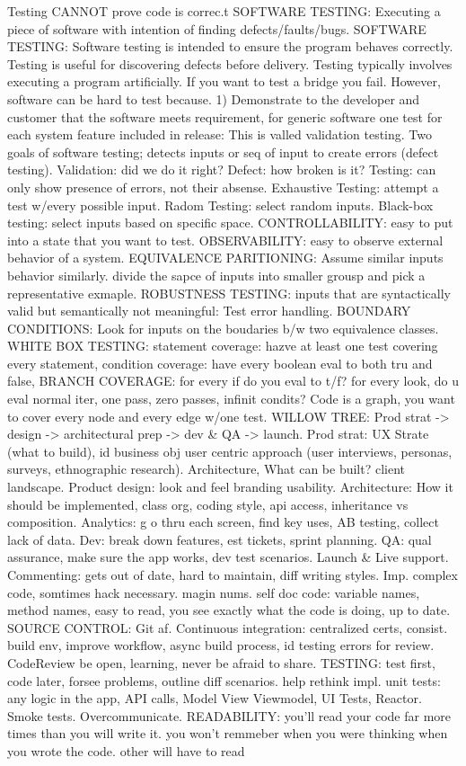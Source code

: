 \documentclass[10pt]{article}
\begin{document}
\begin{landscape}
\begin{multicols*}{6}
Testing CANNOT prove code is correc.t SOFTWARE TESTING: Executing a piece of software with intention of finding defects/faults/bugs. SOFTWARE TESTING: Software testing is intended to ensure the program behaves correctly. Testing is useful for discovering defects before delivery. Testing typically involves executing a program artificially. If you want to test a bridge you fail. However, software can be hard to test because. 1) Demonstrate to the developer and customer that the software meets requirement, for generic software one test for each system feature included in release: This is valled validation testing. Two goals of software testing; detects inputs or seq of input to create errors (defect testing). Validation: did we do it right? Defect: how broken is it? Testing: can only show presence of errors, not their absense. Exhaustive Testing: attempt a test w/every possible input. Radom Testing: select random inputs. Black-box testing: select inputs based on specific space. CONTROLLABILITY: easy to put into a state that you want to test. OBSERVABILITY: easy to observe external behavior of a system. EQUIVALENCE PARITIONING: Assume similar inputs behavior similarly. divide the sapce of inputs into smaller grousp and pick a representative exmaple. ROBUSTNESS TESTING: inputs that are syntactically valid but semantically not meaningful: Test error handling. BOUNDARY CONDITIONS: Look for inputs on the boudaries b/w two equivalence classes. WHITE BOX TESTING: statement coverage: hazve at least one test covering every statement, condition coverage: have every boolean eval to both tru and false, BRANCH COVERAGE: for every if do you eval to t/f? for every look, do u eval normal iter, one pass, zero passes, infinit condits? Code is a graph, you want to cover every node and every edge w/one test. WILLOW TREE: Prod strat -> design -> architectural prep -> dev & QA -> launch. Prod strat: UX Strate (what to build), id business obj user centric approach (user interviews, personas, surveys, ethnographic research). Architecture, What can be built? client landscape. Product design: look and feel branding usability. Architecture: How it should be implemented, class org, coding style, api access, inheritance vs composition. Analytics: g o thru each screen, find key uses, AB testing, collect lack of data. Dev: break down features, est tickets, sprint planning. QA: qual assurance, make sure the app works, dev test scenarios. Launch & Live support. Commenting: gets out of date, hard to maintain, diff writing styles. Imp. complex code, somtimes hack necessary. magin nums. self doc code: variable names, method names, easy to read, you see exactly what the code is doing, up to date. SOURCE CONTROL: Git af. Continuous integration: centralized certs, consist. build env, improve workflow, async build process, id testing errors for review. CodeReview be open, learning, never be afraid to share. TESTING: test first, code later, forsee problems, outline diff scenarios. help rethink impl. unit tests: any logic in the app, API calls, Model View Viewmodel, UI Tests, Reactor. Smoke tests. Overcommunicate. READABILITY: you'll read your code far more times than you will write it. you won't remmeber when you were thinking when you wrote the code. other will have to read 
\end{multicols*}
\end{landscape}
\end{document}
